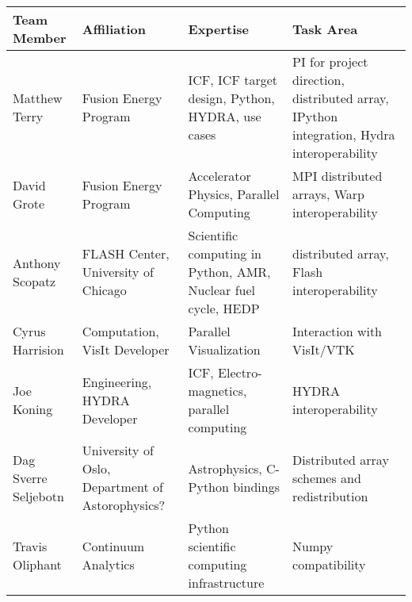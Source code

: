 \documentclass[letterpaper,11pt]{article}
\newlength{\DUtablewidth} %
\begin{document}
\setlength{\DUtablewidth}{\linewidth}
\begin{longtable*}[c]{|p{0.187\DUtablewidth}|p{0.251\DUtablewidth}|p{0.260\DUtablewidth}|p{0.251\DUtablewidth}|}
	\hline
	\textbf{Team Member} & \textbf{Affiliation} & \textbf{Expertise} & \textbf{Task Area} \\
	\hline
	\endfirsthead
	\hline

	Matthew Terry &
	Fusion Energy Program &
	ICF, ICF target design, Python, HYDRA, use cases &
	PI for project direction, distributed array, IPython integration, Hydra interoperability \\
	\hline

	David Grote &
	Fusion Energy Program &
	Accelerator Physics, Parallel Computing &
	MPI distributed arrays, Warp interoperability \\
	\hline

	Anthony Scopatz &
	FLASH Center, University of Chicago &
	Scientific computing in Python, AMR, Nuclear fuel cycle, HEDP &
	distributed array, Flash interoperability \\
	\hline

	Cyrus Harrision &
	Computation, VisIt Developer &
	Parallel Visualization &
	Interaction with VisIt/VTK  \\
	\hline

	Joe Koning &
	Engineering, HYDRA Developer & 
	ICF, Electro-magnetics, parallel computing & 
	HYDRA interoperability \\
	\hline

	Dag Sverre Seljebotn &
	University of Oslo, Department of Astorophysics? & 
	Astrophysics, C-Python bindings &
	Distributed array schemes and redistribution \\
	\hline

	Travis Oliphant &
	Continuum Analytics &
	Python scientific computing infrastructure &
	Numpy compatibility \\

	\hline
\end{longtable*}



\end{document}
